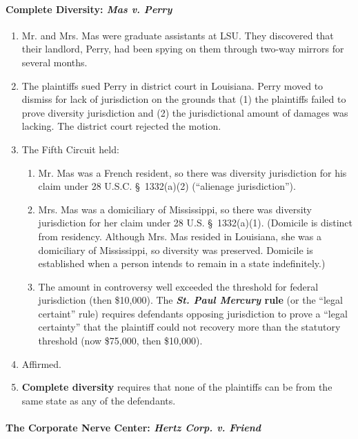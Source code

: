 \paragraph{Complete Diversity: \emph{Mas v. Perry}}

\begin{enumerate}
    \item Mr. and Mrs. Mas were graduate assistants at LSU. They discovered 
    that their landlord, Perry, had been spying on them through two-way 
    mirrors for several months.
    \item The plaintiffs sued Perry in district court in Louisiana. Perry 
    moved to dismiss for lack of jurisdiction on the grounds that (1) the 
    plaintiffs failed to prove diversity jurisdiction and (2) the 
    jurisdictional amount of damages was lacking. The district court rejected 
    the motion.
    \item The Fifth Circuit held:
    \begin{enumerate}
        \item Mr. Mas was a French resident, so there was diversity 
        jurisdiction for his claim under 28 U.S.C. \S\ 1332(a)(2) (``alienage 
        jurisdiction'').
        \item Mrs. Mas was a domiciliary of Mississippi, so there was 
        diversity jurisdiction for her claim under 28 U.S. \S\ 1332(a)(1). 
        (Domicile is distinct from residency. Although Mrs. Mas resided in 
        Louisiana, she was a domiciliary of Mississippi, so diversity was 
        preserved. Domicile is established when a person intends to remain in 
        a state indefinitely.)
        \item The amount in controversy well exceeded the threshold for 
        federal jurisdiction (then \$10,000). The \textbf{\emph{St. Paul 
        Mercury} rule} (or the ``legal certaint'' rule) requires defendants 
        opposing jurisdiction to prove a ``legal certainty'' that the 
        plaintiff could not recovery more than the statutory threshold (now 
        \$75,000, then \$10,000).
    \end{enumerate}
    \item Affirmed.
    \item \textbf{Complete diversity} requires that none of the plaintiffs can 
    be from the same state as any of the defendants.
\end{enumerate}

\paragraph{The Corporate Nerve Center: \emph{Hertz Corp. v. Friend}}

